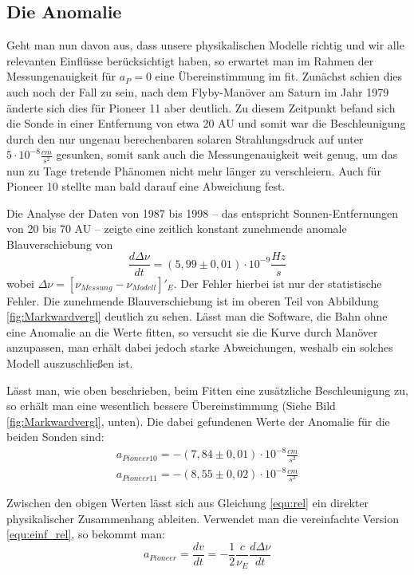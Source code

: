 \subsection{Die Anomalie}
Geht man nun davon aus, dass unsere physikalischen Modelle richtig und wir alle relevanten Einflüsse berücksichtigt haben, so erwartet man im Rahmen der Messungenauigkeit für $a_P = 0$ eine Übereinstimmung im fit.
Zunächst schien dies auch noch der Fall zu sein, nach dem Flyby-Manöver am Saturn im Jahr 1979 änderte sich dies für Pioneer 11 aber deutlich. Zu diesem Zeitpunkt befand sich die Sonde in einer Entfernung von etwa 20 AU und somit war die Beschleunigung durch den nur ungenau berechenbaren solaren Strahlungsdruck auf unter $5 \cdot 10^{-8} \frac{cm}{s^2}$ gesunken, %
somit sank auch die Messungenauigkeit weit genug, um das nun zu Tage tretende Phänomen nicht mehr länger zu verschleiern.
Auch für Pioneer 10 stellte man bald darauf eine Abweichung fest.

Die Analyse der Daten von 1987 bis 1998 – das entspricht Sonnen-Entfernungen von 20 bis 70 AU –
zeigte eine zeitlich konstant zunehmende anomale Blauverschiebung von
\begin{equation}
  \frac{d\Delta\nu}{dt}=(5,99\pm0,01)\cdot10^{-9}\frac{Hz}{s}
\end{equation}
wobei $\Delta\nu=[\nu_{Messung}-\nu_{Modell}]'_E$.\cite{Dittus2006} Der Fehler hierbei ist nur der statistische Fehler. Die zunehmende Blauverschiebung ist im oberen Teil von Abbildung \ref{fig:Markwardvergl} deutlich zu sehen. Lässt man die Software, die Bahn ohne eine Anomalie an die Werte fitten, so versucht sie  die Kurve durch Manöver anzupassen, man erhält dabei jedoch starke Abweichungen, weshalb ein solches Modell auszuschließen ist.\cite{Markwardt2002}

Lässt man, wie oben beschrieben, beim Fitten eine zusätzliche Beschleunigung zu, so erhält man eine wesentlich bessere Übereinstimmung (Siehe Bild \ref{fig:Markwardvergl}, unten). Die dabei gefundenen Werte der Anomalie für die beiden Sonden sind:
\begin{eqnarray}
  a_{Pioneer 10} = -(7,84\pm0,01)\cdot10^{-8}\frac{cm}{s^2} \\  
  a_{Pioneer 11} = -(8,55\pm0,02)\cdot10^{-8}\frac{cm}{s^2}
\end{eqnarray}

Zwischen den obigen Werten lässt sich aus Gleichung \ref{equ:rel} ein direkter physikalischer Zusammenhang ableiten. Verwendet man die vereinfachte Version \ref{equ:einf_rel}, so bekommt man:
\begin{equation}
  a_{Pioneer}=\frac{dv}{dt}=-\frac{1}{2}\frac{c}{\nu_E}\frac{d\Delta\nu}{dt}
\end{equation}

